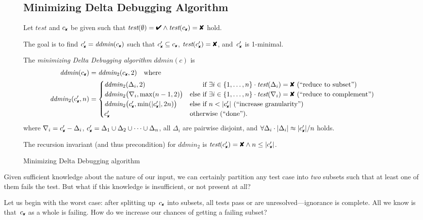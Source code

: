 \documentclass{acm_proc_article-sp}
\newcommand{\PASS}{\text{\ding{52}}\xspace}
\newcommand{\FAIL}{\text{\ding{56}}\xspace}
\newcommand{\cfail}{{c_{\scriptscriptstyle \FAIL}}}
\newcommand{\dfail}{{c'_{\scriptscriptstyle \FAIL}}}
\newcommand{\test}{\textit{test}\xspace}
\newcommand{\ddmin}{\textit{ddmin}\xspace}
\theoremstyle{plain}
\begin{document}
\begin{figure*}[t]
\begin{boxedminipage}{\textwidth}
\subsection*{Minimizing Delta Debugging Algorithm}
\medskip

Let $\test$ and $\cfail$ be given such that $\test(\emptyset) = \PASS \land
\test(\cfail) = \FAIL$ hold.

The goal is to find $\dfail = \ddmin(\cfail)$ such that $\dfail \subseteq
\cfail$, $\test(\dfail) = \FAIL$, and~$\dfail$ is 1-minimal.

The \emph{minimizing Delta Debugging algorithm} $\ddmin(c)$ is 
\begin{align*}
\ddmin(\cfail) &= \ddmin_2(\cfail, 2) \quad \text{where} \\
\ddmin_2(\dfail, n) &= 
\begin{cases}
\ddmin_2(\Delta_i, 2) & \text{\hphantom{else }if $\exists i \in \{1, \dots, n\} \cdot \test(\Delta_i) = \FAIL$ (``reduce to subset'')} \\
\ddmin_2\bigl(\nabla_i, \max(n - 1, 2)\bigr) & 
\text{else if $\exists i \in \{1, \dots, n\} \cdot \test(\nabla_i) = \FAIL$ (``reduce to complement'')} \\
\ddmin_2\bigl(\dfail, \min(|\dfail|, 2n)\bigr) & \text{else if $n < |\dfail|$ (``increase granularity'')} \\
\dfail & \text{otherwise (``done'').}
\end{cases}
\end{align*}
where $\nabla_i = \dfail - \Delta_i$, $\dfail = \Delta_1 \cup \Delta_2 \cup \dots \cup \Delta_n$, all
$\Delta_i$ are pairwise disjoint, and $\forall \Delta_i \cdot |\Delta_i| \approx |\dfail| / n$
holds.

The recursion invariant (and thus precondition) for $\ddmin_2$ is 
$\test(\dfail) = \FAIL \land n \leq |\dfail|$.
\end{boxedminipage}
\caption{Minimizing Delta Debugging algorithm}
\label{fig:ddmin}
\end{figure*}

Given sufficient knowledge about the nature of our input, we can
certainly partition any test case into \emph{two} subsets such that at
least one of them fails the test.  But what if this knowledge is
insufficient, or not present at all?

Let us begin with the worst case: after splitting up~$\cfail$ into
subsets, all tests pass or are unresolved---ignorance is complete.
All we know is that~$\cfail$ as a whole is failing.  How do we
increase our chances of getting a failing subset?
\end{document}
